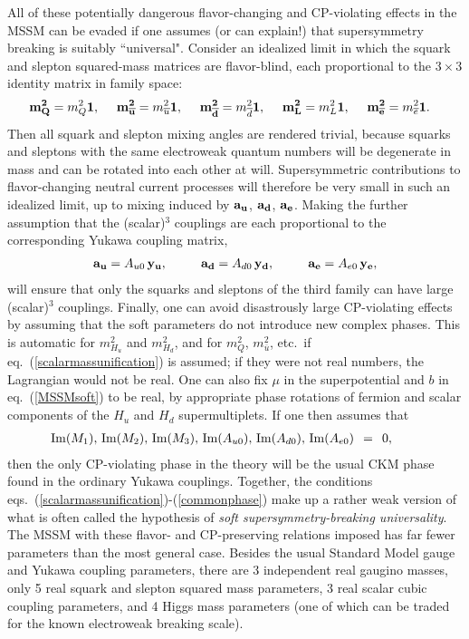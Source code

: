 \documentclass[11pt]{article}
\def\beq{\begin{eqnarray}}
\def\eeq{\end{eqnarray}}
\def\sbar{\overline}
\begin{document}
\vspace{0.6mm}

All of these potentially dangerous flavor-changing and CP-violating
effects in the MSSM can be evaded if one assumes (or can explain!) that
supersymmetry breaking is suitably ``universal". Consider an idealized
limit in which the squark and slepton squared-mass matrices are
flavor-blind, each proportional to the $3\times 3$ identity matrix in
family space: 
\beq
{\bf m^2_{Q}} = m^2_{Q} {\bf 1},
\qquad\!\!\!\!
{\bf m^2_{\sbar u}} = m^2_{\sbar u} {\bf 1},
\qquad\!\!\!\!
{\bf m^2_{\sbar d}} = m^2_{\sbar d} {\bf 1},
\qquad\!\!\!\!
{\bf m^2_{L}} = m^2_{L} {\bf 1},
\qquad\!\!\!\!
{\bf m^2_{\sbar e}} = m^2_{\sbar e} {\bf 1}
.\>\>\>\>{}
\label{scalarmassunification}
\eeq
Then all squark and slepton mixing angles are rendered trivial, because
squarks and sleptons with the same electroweak quantum numbers will be
degenerate in mass and can be rotated into each other at will.
Supersymmetric contributions to flavor-changing neutral current processes
will therefore be very small in such an idealized limit, up to mixing
induced by $\bf a_u$, $\bf a_d$, $\bf a_e$. Making the further assumption
that the (scalar)$^3$ couplings are each proportional to the corresponding
Yukawa coupling matrix,
\beq
{\bf a_u} = A_{u0} \,{\bf y_u}, \>\>\>\qquad
{\bf a_d} = A_{d0} \,{\bf y_d}, \>\>\>\qquad
{\bf a_e} = A_{e0} \,{\bf y_e},
\label{aunification}
\eeq
will ensure that only the squarks and sleptons of the third family can
have large (scalar)$^3$ couplings. Finally, one can avoid disastrously
large CP-violating effects by assuming that the soft parameters do not
introduce new complex phases. This is automatic for $m_{H_u}^2$ and
$m_{H_d}^2$, and for $m_Q^2$, $m_{\sbar u}^2$, etc.~if
eq.~(\ref{scalarmassunification}) is assumed; if they were not real
numbers, the Lagrangian would not be real. One can also fix $\mu$ in the
superpotential and $b$ in eq.~(\ref{MSSMsoft}) to be real, by appropriate
phase rotations of fermion and scalar components of the $H_u$ and $H_d$
supermultiplets. If one then assumes that
\beq
{\rm Im} (M_1),\, {\rm Im} (M_2),\, {\rm Im} (M_3),\,
{\rm Im} (A_{u0}),\, {\rm Im} (A_{d0}),\, {\rm Im} (A_{e0}) 
\>\> = \>\>
0,
\qquad{}
\label{commonphase}
\eeq
then the only CP-violating phase in the theory will be the usual CKM phase
found in the ordinary Yukawa couplings. Together, the conditions
eqs.~(\ref{scalarmassunification})-(\ref{commonphase}) make up a rather
weak version of what is often called the hypothesis of {\it soft
supersymmetry-breaking universality}. The MSSM with these flavor- and
CP-preserving relations imposed has far fewer parameters than the most
general case. Besides the usual Standard Model gauge and Yukawa coupling
parameters, there are 3 independent real gaugino masses, only 5 real
squark and slepton squared mass parameters, 3 real scalar cubic coupling
parameters, and 4 Higgs mass parameters (one of which can be traded for
the known electroweak breaking scale). 
\end{document}
